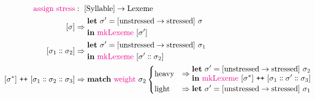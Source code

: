 \documentclass{report}[12pt]
\begin{document}
\begin{align*}
  \text{\textcolor{magenta}{assign stress}} & :\ [\text{Syllable}] \rightarrow \text{Lexeme} \\
  [\sigma] & \Rightarrow \begin{aligned}
                                                            & \textbf{let}\ \sigma' = [\text{unstressed} \rightarrow \text{stressed}] \ \sigma \\
                                                            & \textbf{in}\ \text{\textcolor{magenta}{mkLexeme}}\ [\sigma'] \\
                                                          \end{aligned} \\
  [\sigma_1 \dblcolon \sigma_2] & \Rightarrow \begin{aligned}
                                                            & \textbf{let}\ \sigma' = [\text{unstressed} \rightarrow \text{stressed}] \ \sigma_1 \\
                                                            & \textbf{in}\ \text{\textcolor{magenta}{mkLexeme}}\ [\sigma' \dblcolon \sigma_2] \\
                                                          \end{aligned} \\
  [\sigma^{*}]\ \texttt{++}\ [\sigma_1 \dblcolon \sigma_2 \dblcolon \sigma_3] & \Rightarrow \textbf{match}\ \text{\textcolor{magenta}{weight}}\ \sigma_2
                                                      \begin{cases}
                                                        \text{heavy} & \Rightarrow \begin{aligned}
                                                                                     & \textbf{let}\ \sigma' = [\text{unstressed} \rightarrow \text{stressed}]\ \sigma_2 \\
                                                                                     & \textbf{in}\ \text{\textcolor{magenta}{mkLexeme}}\ [\sigma^{*}]\ \texttt{++}\ [\sigma_1 \dblcolon \sigma' \dblcolon \sigma_3] \\
                                                                                   \end{aligned} \\
                                                        \text{light} & \Rightarrow \begin{aligned}
                                                                                     & \textbf{let}\ \sigma' = [\text{unstressed} \rightarrow \text{stressed}]\ \sigma_1 \\

\end{aligned}
\end{cases}
\end{align*}
\end{document}

